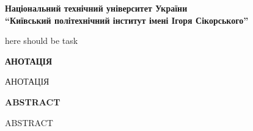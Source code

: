 \thispagestyle{empty}

\begin{center}
\textbf{Національний технічний  університет України \\
``Київський політехнічний інститут імені Ігоря Сікорського''}
\end{center}

here should be task


\newpage
\thispagestyle{empty}
\begin{center}
\textbf{\Large АНОТАЦІЯ}
\end{center}

АНОТАЦІЯ

\newpage
\thispagestyle{empty}

\begin{center}
\textbf{\Large ABSTRACT}
\end{center}

ABSTRACT